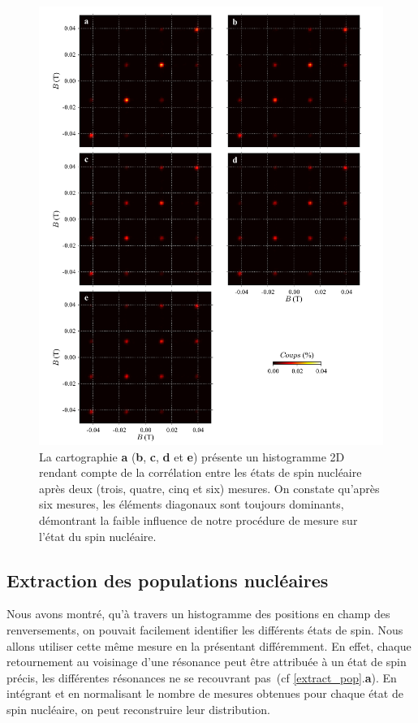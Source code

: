 \begin{figure}
\includegraphics[scale=0.45]{Resultats/MesureInfl/MesureInfl.pdf} 
\caption{La cartographie \textbf{a} (\textbf{b}, \textbf{c}, \textbf{d} et \textbf{e}) présente un histogramme 2D rendant compte de la corrélation entre les états de spin nucléaire après deux (trois, quatre, cinq et six) mesures. On constate qu'après six mesures, les éléments diagonaux sont toujours dominants, démontrant la faible influence de notre procédure de mesure sur l'état du spin nucléaire.}
\label{evolution_mesures}
\end{figure}

\subsection{Extraction des populations nucléaires}
Nous avons montré, qu'à travers un histogramme des positions en champ des renversements, on pouvait facilement identifier les différents états de spin. Nous allons utiliser cette m\^eme mesure en la présentant différemment. En effet, chaque retournement au voisinage d'une résonance peut \^etre attribuée à un état de spin précis, les différentes résonances ne se recouvrant pas~(cf \ref{extract_pop}.\textbf{a}). En intégrant et en normalisant le nombre de mesures obtenues pour chaque état de spin nucléaire, on peut reconstruire leur distribution. 

